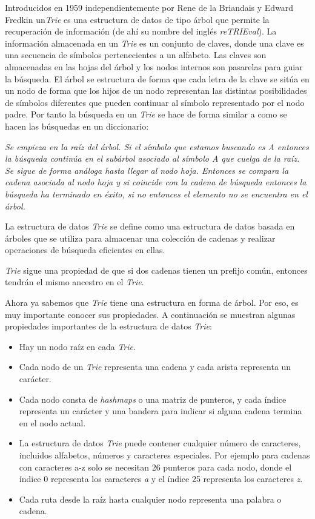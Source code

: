 Introducidos en 1959 independientemente por Rene de la Briandais y Edward Fredkin un\emph{Trie} es una estructura de datos de tipo árbol que permite la recuperación 
de información (de ahí su nombre del inglés \emph{reTRIEval}). La información almacenada en un \emph{Trie} es un conjunto de claves, donde una clave es una secuencia 
de símbolos pertenecientes a un alfabeto. Las claves son almacenadas en las hojas del árbol y los nodos internos son pasarelas para guiar la búsqueda. El árbol se 
estructura de forma que cada letra de la clave se sitúa en un nodo de forma que los hijos de un nodo representan las distintas posibilidades de símbolos diferentes 
que pueden continuar al símbolo representado por el nodo padre. Por tanto la búsqueda en un \emph{Trie} se hace de forma similar a como se hacen las búsquedas en un 
diccionario: 

\emph{Se empieza en la raíz del árbol. Si el símbolo que estamos buscando es A entonces la búsqueda continúa en el subárbol asociado al símbolo A que cuelga de la raíz. Se sigue de forma análoga hasta llegar al nodo hoja. Entonces se compara la cadena asociada al nodo hoja y si coincide con la cadena de búsqueda entonces la búsqueda ha terminado en éxito, si no entonces el elemento no se encuentra en el árbol.}

La estructura de datos \emph{Trie} se define como una estructura de datos basada en árboles que se utiliza para almacenar una colección de cadenas y realizar operaciones de búsqueda eficientes en ellas. 

\emph{Trie} sigue una propiedad de que si dos cadenas tienen un prefijo común, entonces tendrán el mismo ancestro en el \emph{Trie}.

Ahora ya sabemos que \emph{Trie} tiene una estructura en forma de árbol. Por eso, es muy importante conocer sus propiedades. A continuación se muestran algunas propiedades importantes de la estructura de datos \emph{Trie}:

\begin{itemize}
	\item Hay un nodo raíz en cada \emph{Trie}.
	\item  Cada nodo de un \emph{Trie} representa una cadena y cada arista representa un carácter.
	\item  Cada nodo consta de \emph{hashmaps} o una matriz de punteros, y cada índice representa un carácter y una bandera para indicar si alguna cadena termina en el nodo actual.
	\item La estructura de datos \emph{Trie} puede contener cualquier número de caracteres, incluidos alfabetos, números y caracteres especiales. Por ejemplo para cadenas con caracteres a-z  solo se necesitan 26 punteros para cada nodo, donde el índice 0 representa los caracteres \emph{a} y el índice 25 representa los caracteres \emph{z}.
	\item  Cada ruta desde la raíz hasta cualquier nodo representa una palabra o cadena.
\end{itemize}

